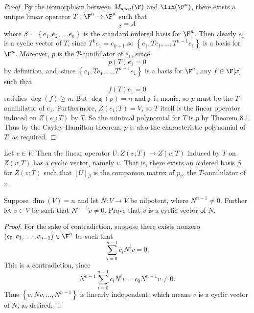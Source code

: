 \documentclass[linearalgebra]{subfiles}
\begin{document}
    \begin{proof}
        By the isomorphism between $M_{n\times n}(\F)$ and $\lin(\F^n)$, there exists a unique linear operator $T:\F^n\to\F^n$ such that
        \begin{equation*}
            [T]_\beta = A
        \end{equation*}
        where $\beta = \left\lbrace e_1, e_2, \ldots. e_n \right\rbrace$ is the standard ordered basis for $\F^n$. Then clearly $e_1$ is a cyclic vector of $T$, since $T^ke_1 = e_{k+1}$ so $\left\lbrace e_1, Te_1, \ldots, T^{n-1}e_1 \right\rbrace$ is a basis for $\F^n$. Moreover, $p$ is the $T$-annihilator of $e_1$, since
        \begin{equation*}
            p(T)e_1 = 0
        \end{equation*}
        by definition, and, since $\left\lbrace e_1, Te_1, \ldots, T^{n-1}e_1 \right\rbrace$ is a basis for $\F^n$, any $f\in\F[x]$ such that
        \begin{equation*}
            f(T)e_1 = 0
        \end{equation*}
        satisfies $\deg(f)\geq n$. But $\deg(p) = n$ and $p$ is monic, so $p$ must be the $T$-annihilator of $e_1$. Furthermore, $Z(e_1;T)=V$, so $T$ itself is the linear operator induced on $Z(e_1;T)$ by $T$. So the minimal polynomial for $T$ is $p$ by Theorem 8.1. Thus by the Cayley-Hamilton theorem, $p$ is also the characteristic polynomial of $T$, as required.
    \end{proof}

    \begin{remark}
        Let $v\in V$. Then the linear operator $U:Z(v;T)\to Z(v;T)$ induced by $T$ on $Z(v;T)$ has a cyclic vector, namely $v$. That is, there exists an ordered basis $\beta$ for $Z(v;T)$ such that $[U]_\beta$ is the companion matrix of $p_v$, the $T$-annihilator of $v$.
    \end{remark}

    \begin{example}
        Suppose $\dim(V)=n$ and let $N:V\to V$ be nilpotent, where $N^{n-1}\neq 0$. Further let $v\in V$ be such that $N^{n-1}v\neq 0$. Prove that $v$ is a cyclic vector of $N$.
    \end{example}

    \begin{proof}
        For the sake of contradiction, suppose there exists nonzero $\left( c_0, c_1, \ldots, c_{n-1} \right) \in\F^n$ be such that
        \begin{equation*}
            \sum^{n-1}_{i=0} c_iN^iv = 0.
        \end{equation*}
        This is a contradiction, since
        \begin{equation*}
            N^{n-1} \sum^{n-1}_{i=0} c_iN^iv = c_0N^{n-1}v \neq 0.
        \end{equation*}
        Thus $\left\lbrace v, Nv, \ldots, N^{n-1} \right\rbrace$ is linearly independent, which means $v$ is a cyclic vector of $N$, as desired.
    \end{proof}
\end{document}
